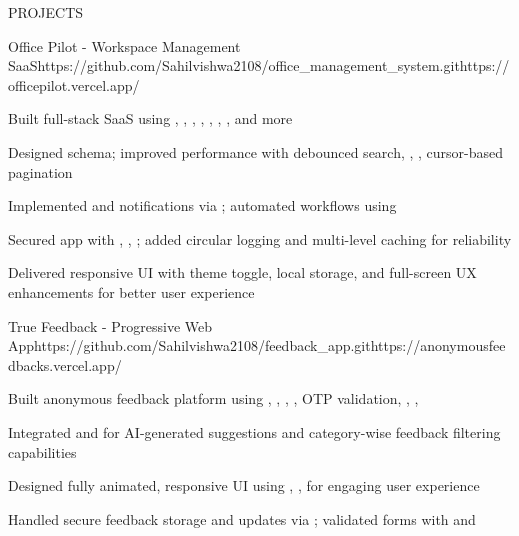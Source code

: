 \documentclass{resume}
\begin{document}
\begin{rSection}{PROJECTS}

\begin{rProject}{Office Pilot - Workspace Management SaaS}{https://github.com/Sahilvishwa2108/office_management_system.git}{https://officepilot.vercel.app/}
\item Built full-stack SaaS using , , , , , , ,  and more
\item Designed  schema; improved performance with debounced search, , , cursor-based pagination
\item Implemented  and notifications via ; automated workflows using 
\item Secured app with , , ; added circular logging and multi-level caching for reliability
\item Delivered responsive UI with theme toggle, local storage, and full-screen UX enhancements for better user experience
\end{rProject}

\begin{rProject}{True Feedback - Progressive Web App}{https://github.com/Sahilvishwa2108/feedback_app.git}{https://anonymousfeedbacks.vercel.app/}
\item Built anonymous feedback platform using , , , , OTP validation, , , 
\item Integrated  and  for AI-generated suggestions and category-wise feedback filtering capabilities
\item Designed fully animated, responsive UI using , ,  for engaging user experience
\item Handled secure feedback storage and updates via ; validated forms with  and 
\end{rProject}


\end{rSection}
\end{document}
